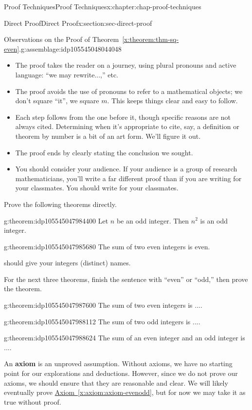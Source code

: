 \documentclass[oneside,10pt,]{book}
\newcommand{\xreffont}{\relax}
\newcommand{\terminology}[1]{\textbf{#1}}
\begin{document}
\begin{chapterptx}{Proof Techniques}{}{Proof Techniques}{}{}{x:chapter:chap-proof-techniques}
\begin{sectionptx}{Direct Proof}{}{Direct Proof}{}{}{x:section:sec-direct-proof}
\begin{assemblage}{Observations on the Proof of Theorem~{\xreffont\ref*{x:theorem:thm-sq-even}}.}{g:assemblage:idp105545048044048}
\begin{itemize}[label=\textbullet]
\item{}The proof takes the reader on a journey, using plural pronouns and active language: ``we may rewrite...,'' etc.%
\item{}The proof avoids the use of pronouns to refer to a mathematical objects; we don't square ``it'', we square \(m\). This keeps things clear and easy to follow.%
\item{}Each step follows from the one before it, though specific reasons are not always cited. Determining when it's appropriate to cite, say, a definition or theorem by number is a bit of an art form. We'll figure it out.%
\item{}The proof ends by clearly stating the conclusion we sought.%
\item{}You should consider your audience. If your audience is a group of research mathematicians, you'll write a far different proof than if you are writing for your classmates. You should write for your classmates.%
\end{itemize}
%
\end{assemblage}
Prove the following theorems directly.%
\begin{theorem}{}{}{g:theorem:idp105545047984400}%
Let \(n\) be an odd integer. Then \(n^2\) is an odd integer.%
\end{theorem}
\begin{theorem}{}{}{g:theorem:idp105545047985680}%
The sum of two even integers is even.%
\par\smallskip%
\noindentYou should give your integers (distinct) names.%
\end{theorem}
For the next three theorems, finish the sentence with ``even'' or ``odd,'' then prove the theorem.%
\begin{theorem}{}{}{g:theorem:idp105545047987600}%
The sum of two even integers is ....%
\end{theorem}
\begin{theorem}{}{}{g:theorem:idp105545047988112}%
The sum of two odd integers is ....%
\end{theorem}
\begin{theorem}{}{}{g:theorem:idp105545047988624}%
The sum of an even integer and an odd integer is ....%
\end{theorem}
An \terminology{axiom} is an unproved assumption. Without axioms, we have no starting point for our explorations and deductions. However, since we do not prove our axioms, we should ensure that they are reasonable and clear. We will likely eventually prove \hyperref[x:axiom:axiom-evenodd]{Axiom~{\xreffont\ref{x:axiom:axiom-evenodd}}}, but for now we may take it as true without proof.%

\end{sectionptx}
\end{chapterptx}
\end{document}
